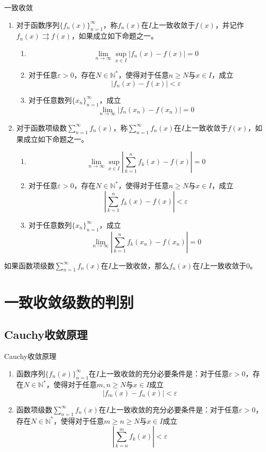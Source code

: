 \documentclass[lang = cn, scheme = chinese, thmcnt = section]{elegantbook}
\newcommand{\N}{\mathbb{N}}            %
\newcommand{\dis}{\displaystyle}
\begin{document}
\begin{definition}{一致收敛}
	\begin{enumerate}
		\item 对于函数序列$\{f_n(x)\}_{n=1}^{\infty}$，称$f_n(x)$在$I$上一致收敛于$f(x)$，并记作$f_n(x)\rightrightarrows f(x)$，如果成立如下命题之一。
		\begin{enumerate}
			\item 
			$$
			\lim_{n\to\infty}\sup_{x\in I}|f_n(x)-f(x)|=0
			$$
			\item 对于任意$\varepsilon>0$，存在$N\in\N^*$，使得对于任意$n\ge N$与$x\in I$，成立
			$$
			|f_n(x)-f(x)|<\varepsilon
			$$
			\item 对于任意数列$\{x_n\}_{n=1}^{\infty}$，成立
			$$
			\lim_{n\to\infty}|f_n(x_n)-f(x_n)|=0
			$$
		\end{enumerate}
		\item 对于函数项级数$\dis\sum_{n=1}^{\infty}f_n(x)$，称$\dis\sum_{n=1}^{\infty}f_n(x)$在$I$上一致收敛于$f(x)$，如果成立如下命题之一。
		\begin{enumerate}
			\item 
			$$
			\lim_{n\to\infty}\sup_{x\in I}\left| \sum_{k=1}^{n}f_k(x)-f(x) \right|=0
			$$
			\item 对于任意$\varepsilon>0$，存在$N\in\N^*$，使得对于任意$n\ge N$与$x\in I$，成立
			$$
			\left| \sum_{k=1}^{n}f_k(x)-f(x) \right|<\varepsilon
			$$
			\item 对于任意数列$\{x_n\}_{n=1}^{\infty}$，成立
			$$
			\lim_{n\to\infty}\left| \sum_{k=1}^{n}f_k(x_n)-f(x_n) \right|=0
			$$
		\end{enumerate}
	\end{enumerate}
\end{definition}

\begin{theorem}
	如果函数项级数$\dis\sum_{n=1}^{\infty}f_n(x)$在$I$上一致收敛，那么$f_n(x)$在$I$上一致收敛于$0$。
\end{theorem}

\section{一致收敛级数的判别}

\subsection{Cauchy收敛原理}

\begin{theorem}{Cauchy收敛原理}
	\begin{enumerate}
		\item 函数序列$\{f_n(x)\}_{n=1}^{\infty}$在$I$上一致收敛的充分必要条件是：对于任意$\varepsilon>0$，存在$N\in\N^*$，使得对于任意$m,n\ge N$与$x\in I$成立
		$$
		\left| f_m(x)-f_n(x) \right|<\varepsilon
		$$
		\item 函数项级数$\dis\sum_{n=1}^{\infty}f_n(x)$在$I$上一致收敛的充分必要条件是：对于任意$\varepsilon>0$，存在$N\in\N^*$，使得对于任意$m\ge n\ge N$与$x\in I$成立
		$$
		\left| \sum_{k=n}^{m}f_k(x) \right|<\varepsilon
		$$
	\end{enumerate}
\end{theorem}
\end{document}
